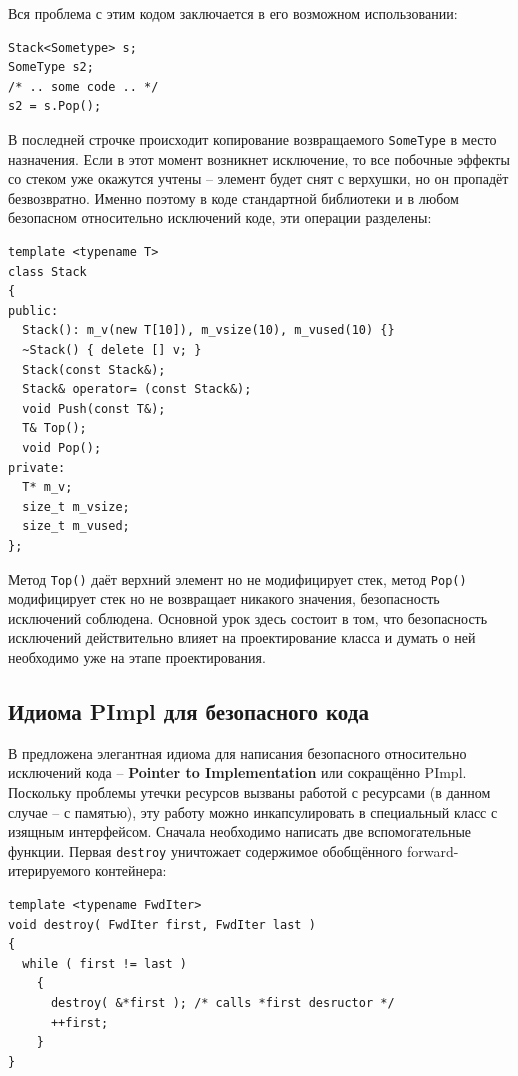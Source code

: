 \documentclass[a4paper,12pt,oneside]{article}
\begin{document}
Вся проблема с этим кодом заключается в его возможном использовании:

\begin{lstlisting}
Stack<Sometype> s;
SomeType s2;
/* .. some code .. */
s2 = s.Pop();
\end{lstlisting}

В последней строчке происходит копирование возвращаемого \lstinline!SomeType! в место назначения. Если в этот момент возникнет исключение, то все побочные эффекты со стеком уже окажутся учтены -- элемент будет снят с верхушки, но он пропадёт безвозвратно. Именно поэтому в коде стандартной библиотеки и в любом безопасном относительно исключений коде, эти операции разделены:

\begin{lstlisting}
template <typename T> 
class Stack
{
public:
  Stack(): m_v(new T[10]), m_vsize(10), m_vused(10) {}
  ~Stack() { delete [] v; }
  Stack(const Stack&);
  Stack& operator= (const Stack&);
  void Push(const T&);
  T& Top();
  void Pop();
private:
  T* m_v;
  size_t m_vsize;
  size_t m_vused;
};
\end{lstlisting}

Метод \lstinline!Top()! даёт верхний элемент но не модифицирует стек, метод \lstinline!Pop()! модифицирует стек но не возвращает никакого значения, безопасность исключений соблюдена. Основной урок здесь состоит в том, что безопасность исключений действительно влияет на проектирование класса и думать о ней необходимо уже на этапе проектирования.

\subsection{Идиома PImpl для безопасного кода}

В \cite{exceptionalcpp} предложена элегантная идиома для написания безопасного относительно исключений кода -- \textbf{Pointer to Implementation} или сокращённо PImpl. Поскольку проблемы утечки ресурсов вызваны работой с ресурсами (в данном случае -- с памятью), эту работу можно инкапсулировать в специальный класс с изящным интерфейсом. Сначала необходимо написать две вспомогательные функции. Первая \lstinline!destroy! уничтожает содержимое обобщённого forward-итерируемого контейнера:

\begin{lstlisting}
template <typename FwdIter>
void destroy( FwdIter first, FwdIter last )
{
  while ( first != last )
    {
      destroy( &*first ); /* calls *first desructor */
      ++first;
    }
}
\end{lstlisting}
\end{document}
